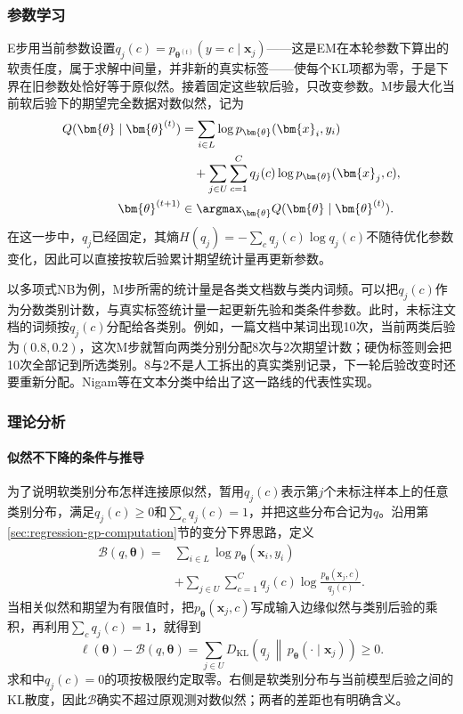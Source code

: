 \subsubsection{参数学习}
E步用当前参数设置$q_j(c)=p_{\bm{\theta}^{(t)}}(y=c\mid\bm{x}_j)$——这是EM在本轮参数下算出的软责任度，属于求解中间量，并非新的真实标签——使每个KL项都为零，于是下界在旧参数处恰好等于原似然。接着固定这些软后验，只改变参数。M步最大化当前软后验下的期望完全数据对数似然，记为
\[
  \begin{aligned}
    Q(\bm{\theta}\mid\bm{\theta}^{(t)})
    &=
    \sum_{i\in L}\log p_{\bm{\theta}}(\bm{x}_i,y_i) \\
    &\quad+
    \sum_{j\in U}\sum_{c=1}^{C}
      q_j(c)\log p_{\bm{\theta}}(\bm{x}_j,c), \\
    \bm{\theta}^{(t+1)}
    &\in\argmax_{\bm{\theta}}
      Q(\bm{\theta}\mid\bm{\theta}^{(t)}).
  \end{aligned}
\]
在这一步中，$q_j$已经固定，其熵$H(q_j)=-\sum_cq_j(c)\log q_j(c)$不随待优化参数变化，因此可以直接按软后验累计期望统计量再更新参数。

以多项式NB为例，M步所需的统计量是各类文档数与类内词频。可以把$q_j(c)$作为分数类别计数，与真实标签统计量一起更新先验和类条件参数。此时，未标注文档的词频按$q_j(c)$分配给各类别。例如，一篇文档中某词出现10次，当前两类后验为$(0.8,0.2)$，这次M步就暂向两类分别分配8次与2次期望计数；硬伪标签则会把10次全部记到所选类别。8与2不是人工拆出的真实类别记录，下一轮后验改变时还要重新分配。Nigam等在文本分类中给出了这一路线的代表性实现。

\subsubsection{理论分析}

\paragraph{似然不下降的条件与推导}
为了说明软类别分布怎样连接原似然，暂用$q_j(c)$表示第$j$个未标注样本上的任意类别分布，满足$q_j(c)\geq0$和$\sum_cq_j(c)=1$，并把这些分布合记为$q$。沿用第\ref{sec:regression-gp-computation}节的变分下界思路，定义
\begin{equation}
  \label{eq:classification-semisupervised-em-bound}
  \begin{aligned}
    \mathcal B(q,\bm\theta)
      ={}&\sum_{i\in L}\log p_{\bm\theta}(\bm x_i,y_i)\\
        &+\sum_{j\in U}\sum_{c=1}^{C}
          q_j(c)\log\frac{p_{\bm\theta}(\bm x_j,c)}{q_j(c)}.
  \end{aligned}
\end{equation}
当相关似然和期望为有限值时，把$p_{\bm\theta}(\bm x_j,c)$写成输入边缘似然与类别后验的乘积，再利用$\sum_cq_j(c)=1$，就得到
\[
  \ell(\bm\theta)-\mathcal B(q,\bm\theta)
    =\sum_{j\in U}D_{\mathrm{KL}}\!\left(
       q_j\,\middle\|\,p_{\bm\theta}(\cdot\mid\bm x_j)\right)
    \geq0.
\]
求和中$q_j(c)=0$的项按极限约定取零。右侧是软类别分布与当前模型后验之间的KL散度，因此$\mathcal B$确实不超过原观测对数似然；两者的差距也有明确含义。

